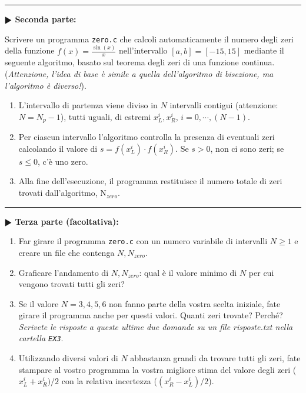 \documentclass[11pt]{article}
\begin{document}
\hrule
\vspace{2mm}
\textbf{$\RHD$ Seconda parte:}

Scrivere un programma \texttt{zero.c} che calcoli automaticamente il numero degli zeri della funzione $f(x)=\frac{\sin(x)}{x}$ nell'intervallo $\left[a,b\right] = \left[-15,15 \right]$ mediante il seguente algoritmo,
basato sul teorema degli zeri di una funzione continua.
\\
({\em Attenzione, l'idea di base \`e simile a quella dell'algoritmo di bisezione, ma l'algoritmo \`e diverso!\/}).
\begin{enumerate}
\item L'intervallo di partenza viene diviso in $N$ intervalli contigui (attenzione: $N = N_p - 1$),
  tutti uguali, di estremi $x_L^{i}, x_R^{i}$, $i=0,\cdots,(N-1)$.
\item Per ciascun intervallo l'algoritmo controlla la presenza di eventuali 
zeri calcolando il valore di $s=f(x_L^{i})\cdot f(x_R^i)$. Se $s>0$,
non ci sono zeri; se $s \le 0$, c'\`e uno zero.
\item Alla fine dell'esecuzione, il programma restituisce il numero totale di zeri
trovati dall'algoritmo, N$_{zero}$.
\end{enumerate}

\newpage

\hrule
\vspace{2mm}
\textbf{$\RHD$ Terza parte (facoltativa):}
\begin{enumerate}
\item Far girare il programma \texttt{zero.c} con un numero variabile di intervalli 
$N \ge 1$ e creare un file che contenga $N, N_{zero}$.
\item Graficare l'andamento di $N, N_{zero}$: qual \`e il valore minimo di $N$
per cui vengono trovati tutti gli zeri?
\item Se il valore $N=3,4,5,6$ non fanno parte della vostra scelta iniziale, fate girare il programma anche per questi valori. Quanti zeri trovate? Perch\'e? 
{\em Scrivete le risposte a queste ultime due domande su un file risposte.txt
nella cartella \texttt{EX3}}.
\item Utilizzando diversi valori di $N$ abbastanza grandi da trovare tutti gli zeri,
  fate stampare al vostro programma la vostra migliore stima del valore degli zeri ($x_L^i + x_R^i) / 2$ con la relativa incertezza ($(x_R^i - x_L^i) / 2$).
\end{enumerate}
\end{document}
